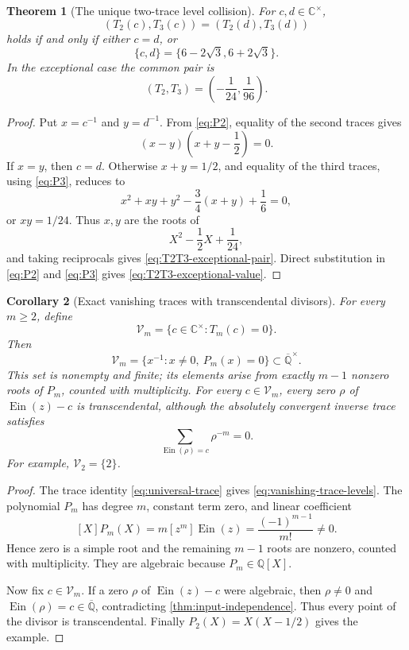 \documentclass[11pt]{article}
\newtheorem{theorem}{Theorem}[section]
\newtheorem{corollary}[theorem]{Corollary}
\theoremstyle{definition}
\theoremstyle{remark}
\newcommand{\Q}{\mathbb Q}
\newcommand{\Qbar}{\overline{\mathbb Q}}
\newcommand{\C}{\mathbb C}
\newcommand{\Ein}{\operatorname{Ein}}
\begin{document}
\begin{theorem}[The unique two-trace level collision]
\label{thm:T2T3-collision}
For \(c,d\in\C^\times\),
\[
 (T_2(c),T_3(c))=(T_2(d),T_3(d))
\]
holds if and only if either \(c=d\), or
\begin{equation}\label{eq:T2T3-exceptional-pair}
 \boxed{\{c,d\}=\{6-2\sqrt3,6+2\sqrt3\}.}
\end{equation}
In the exceptional case the common pair is
\begin{equation}\label{eq:T2T3-exceptional-value}
 \boxed{(T_2,T_3)=\left(-\frac1{24},\frac1{96}\right).}
\end{equation}
\end{theorem}

\begin{proof}
Put \(x=c^{-1}\) and \(y=d^{-1}\).  From \eqref{eq:P2}, equality of the
second traces gives
\[
 (x-y)\left(x+y-\frac12\right)=0.
\]
If \(x=y\), then \(c=d\).  Otherwise \(x+y=1/2\), and equality of the
third traces, using \eqref{eq:P3}, reduces to
\[
 x^2+xy+y^2-\frac34(x+y)+\frac16=0,
\]
or \(xy=1/24\).  Thus \(x,y\) are the roots of
\[
 X^2-\frac12X+\frac1{24},
\]
and taking reciprocals gives \eqref{eq:T2T3-exceptional-pair}.  Direct
substitution in \eqref{eq:P2} and \eqref{eq:P3} gives
\eqref{eq:T2T3-exceptional-value}.
\end{proof}

\begin{corollary}[Exact vanishing traces with transcendental divisors]
\label{cor:vanishing-trace-levels}
For every \(m\ge2\), define
\[
 \mathcal V_m=
 \{c\in\C^\times:T_m(c)=0\}.
\]
Then
\begin{equation}\label{eq:vanishing-trace-levels}
 \boxed{\mathcal V_m=
 \{x^{-1}:x\ne0,\ P_m(x)=0\}\subset\Qbar^\times.}
\end{equation}
This set is nonempty and finite; its elements arise from exactly \(m-1\)
nonzero roots of \(P_m\), counted with multiplicity.  For every
\(c\in\mathcal V_m\), every zero \(\rho\) of \(\Ein(z)-c\) is
transcendental, although the absolutely convergent inverse trace satisfies
\[
 \sum_{\Ein(\rho)=c}\rho^{-m}=0.
\]
For example, \(\mathcal V_2=\{2\}\).
\end{corollary}

\begin{proof}
The trace identity \eqref{eq:universal-trace} gives
\eqref{eq:vanishing-trace-levels}.  The polynomial \(P_m\) has degree
\(m\), constant term zero, and linear coefficient
\[
 [X]P_m(X)=m[z^m]\Ein(z)=\frac{(-1)^{m-1}}{m!}\ne0.
\]
Hence zero is a simple root and the remaining \(m-1\) roots are nonzero,
counted with multiplicity.  They are algebraic because \(P_m\in\Q[X]\).

Now fix \(c\in\mathcal V_m\).  If a zero \(\rho\) of \(\Ein(z)-c\) were
algebraic, then \(\rho\ne0\) and
\(\Ein(\rho)=c\in\Qbar\), contradicting
\cref{thm:input-independence}.  Thus every point of the divisor is
transcendental.  Finally \(P_2(X)=X(X-1/2)\) gives the example.
\end{proof}
\end{document}
